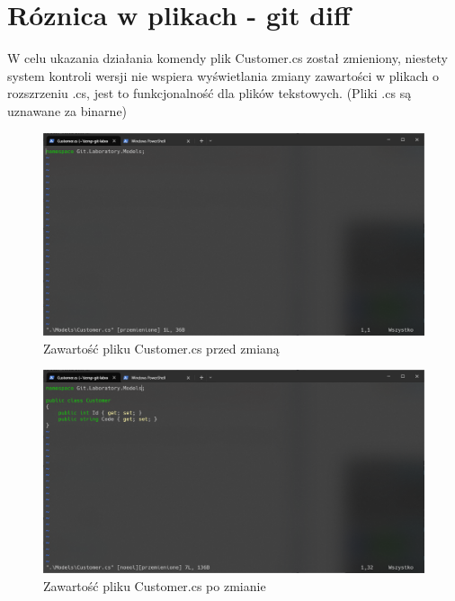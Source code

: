 \documentclass{article}
\begin{document}
\section{Róznica w plikach - git diff}

W celu ukazania działania komendy plik Customer.cs został zmieniony, niestety system kontroli wersji nie wspiera wyświetlania zmiany zawartości w plikach o rozszrzeniu .cs, jest to funkcjonalność dla plików tekstowych. (Pliki .cs są uznawane za binarne)

\vspace*{\fill}
\begin{figure}[!h]
    \caption{Zawartość pliku Customer.cs przed zmianą}
    \centerline{\includegraphics [scale=0.5]{customer-beforeDiff.PNG}}
    \label{fig:label}
\end{figure}
\vspace*{\fill}
\newpage

\vspace*{\fill}
\begin{figure}[!h]
    \caption{Zawartość pliku Customer.cs po zmianie}
    \centerline{\includegraphics [scale=0.5]{customer-afterDiff.PNG}}
    \label{fig:label}
\end{figure}
\vspace*{\fill}
\newpage
\end{document}
